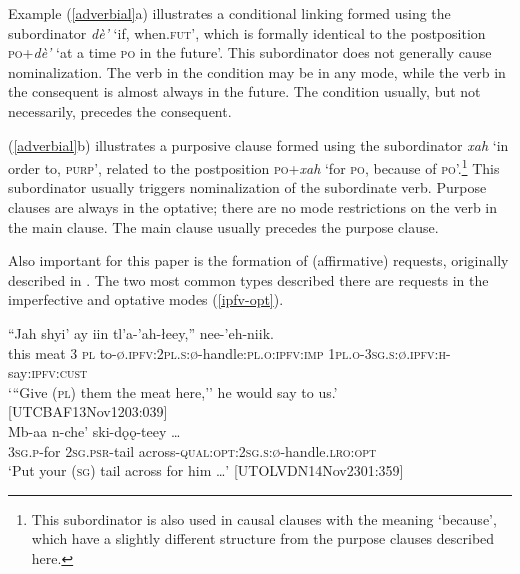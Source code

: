 \documentclass[output=paper,colorlinks,citecolor=brown]{langscibook}
\begin{document}
Example \noindent (\ref{adverbial}a) illustrates a conditional linking formed using the subordinator \textit{dè'} `if, when.\textsc{fut}', which is formally identical to the postposition \textsc{po}+\textit{dè'} `at a time \textsc{po} in the future'. This subordinator does not generally cause nominalization. The verb in the condition may be in any mode, while the verb in the consequent is almost always in the future. The condition usually, but not necessarily, precedes the consequent.  

(\ref{adverbial}b) illustrates a purposive clause formed using the subordinator \textit{xah} `in order to, \textsc{purp}', related to the postposition \textsc{po}+\textit{xah} `for \textsc{po}, because of \textsc{po}'.\footnote{This subordinator is also used in causal clauses with the meaning `because', which have a slightly different structure from the purpose clauses described here.} This subordinator usually triggers nominalization of the subordinate verb. Purpose clauses are always in the optative; there are no mode restrictions on the verb in the main clause. The main clause usually precedes the purpose clause.

Also important for this paper is the formation of (affirmative) requests, originally described in \citet{LovickO2016}. The two most common types described there are requests in the imperfective and optative modes (\ref{ipfv-opt}). 

\begin{exe}
\ex \label{ipfv-opt}
\begin{xlista}
\ex 
\gll ``Jah shyi' ay iin tl'a-'ah-łeey,'' nee-'eh-niik. \\
this meat 3 \textsc{pl} to-\textsc{ø.ipfv:2pl.s:ø}-handle:\textsc{pl.o:ipfv:imp} \textsc{1pl.o-3sg.s:ø.ipfv:h}-say:\textsc{ipfv:cust} \\
\glt `{``}Give (\textsc{pl}) them the meat here,'' he would say to us.' \\ \hfill [UTCBAF13Nov1203:039]\\
\ex 
\gll Mb-aa n-che' ski-dǫǫ-teey \ldots\\
\textsc{3sg.p}-for \textsc{2sg.psr}-tail across-\textsc{qual:opt:2sg.s:ø}-handle.\textsc{lro:opt} \\
\glt `Put your (\textsc{sg}) tail across for him \ldots' \hfill [UTOLVDN14Nov2301:359]\\
\end{xlista}
\end{exe}
\end{document}
